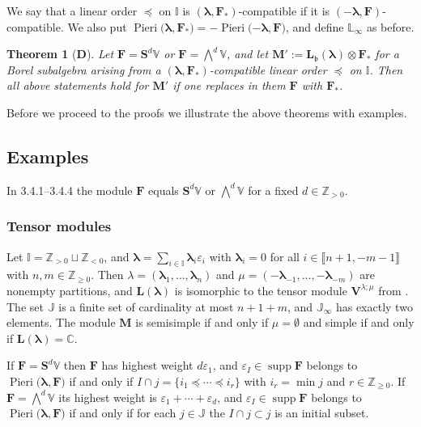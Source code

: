 \documentclass[11pt,fleqn]{amsart}
\newcommand\CC{\mathbb C}
\newcommand\ZZ{\mathbb Z}
\newcommand\II{\mathbb I}
\newcommand\JJ{\mathbb J}
\newcommand\LL{\mathbb L}
\renewcommand\epsilon{\varepsilon}
\newtheorem*{thm*}{Theorem}
\theoremstyle{definition}
\theoremstyle{remark}
\theoremstyle{remark}
\newcommand\VV{\mathbb V}
\renewcommand\SS{\mathbf S}
\newcommand\interval[1]{\llbracket{#1}\rrbracket}
\newcommand\lie[1]{\mathfrak{#1}}
\newcommand\wt[1]{\boldsymbol{#1}}
\DeclareMathOperator\supp{supp}
\newcommand\Pieri[2]{\operatorname{Pieri}{(#1},{#2)}}
\begin{document}
We say that a linear order $\preceq$ on $\II$ is $(\wt\lambda, \mathbf 
F_*)$-compatible if it is $(-\wt\lambda,\mathbf F)$-compatible. We also put
$\Pieri{\wt\lambda}{\mathbf F_*} = -\Pieri{-\wt\lambda}{\mathbf F}$, and define
$\LL_\infty$ as before.

\begin{thm*}[\textbf D]
Let $\mathbf F = \SS^d \VV$ or $\mathbf F = \bigwedge^d \VV$, and
let $\mathbf M' := \mathbf L_{\lie b}(\wt\lambda) \otimes \mathbf 
F_*$ for a Borel subalgebra arising from a $(\wt\lambda, \mathbf 
F_*)$-compatible linear order $\preceq$ on $\II$. Then all above statements 
hold for $\mathbf M'$ if one replaces in them $\mathbf F$ with $\mathbf F_*$.
\end{thm*}

Before we proceed to the proofs we illustrate the above theorems with examples.

\subsection{Examples}
In 3.4.1--3.4.4 the module $\mathbf F$ equals $\SS^d\VV$ or $\bigwedge^d \VV$ 
for a fixed $d \in \ZZ_{>0}$.

\subsubsection{Tensor modules}
Let $\II = \ZZ_{>0} \sqcup \ZZ_{<0}$, and $\wt\lambda = \sum_{i \in \II} 
\wt\lambda_i \epsilon_i$ with $\wt\lambda_i = 0$ for all $i \in \interval{n+1,
-m-1}$ with $n,m \in \ZZ_{\geq0}$. Then $\lambda = (\wt\lambda_1, \ldots, 
\wt\lambda_n)$ and $\mu = (-\wt\lambda_{-1}, \ldots, -\wt\lambda_{-m})$ are 
nonempty partitions, and $\mathbf L(\wt\lambda)$ is isomorphic to the tensor 
module $\mathbf V^{\lambda;\mu}$ from \cite{PS11b}. The set $\JJ$ is a finite 
set of cardinality at most $n+1+m$, and $\JJ_{\infty}$ has exactly two elements.
The module $\mathbf M$ is semisimple if and only if $\mu = \emptyset$ and
simple if and only if $\mathbf L(\wt\lambda) = \CC$.

If $\mathbf F = \SS^d \VV$ then $\mathbf F$ has highest weight $d \epsilon_1$, 
and $\epsilon_I \in \supp \mathbf F$ belongs to $\Pieri{\wt\lambda}{\mathbf F}$ 
if and only if $I \cap j = \{i_1 \preceq \cdots \preceq i_r\}$ with $i_r = \min 
j$ and $r \in 
\ZZ_{\geq 0}$. If $\mathbf F = \bigwedge^d \VV$ its highest weight is $\epsilon_1 + \cdots + \epsilon_d$, and $\epsilon_I \in \supp \mathbf F$ belongs to 
$\Pieri{\wt\lambda}{\mathbf F}$ if and only if for each $j \in \JJ$ the $I \cap 
j \subset j$ is an initial subset. 
\end{document}

